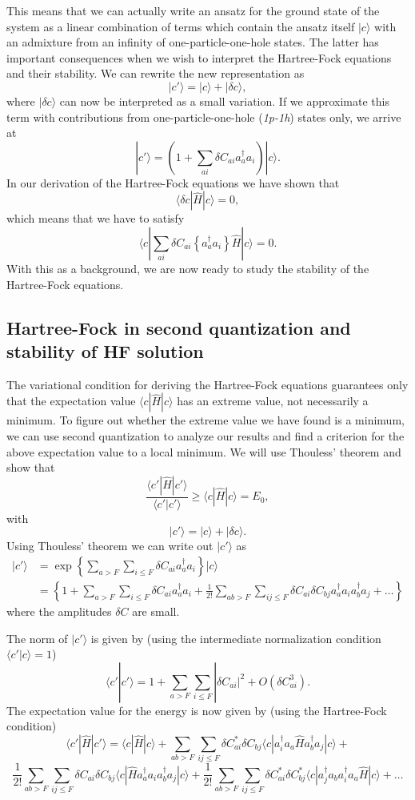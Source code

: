 \documentclass[%
oneside,                 %
final,                   %
10pt]{article}
\begin{document}
This means that we can actually write an ansatz for the ground state of the system as a linear combination of
terms which contain the ansatz itself $|c\rangle$ with  an admixture from an infinity of one-particle-one-hole states. The latter has important consequences when we wish to interpret the Hartree-Fock equations and their stability. We can rewrite the new representation as 
\[
|c'\rangle = |c\rangle+|\delta c\rangle,
\]
where $|\delta c\rangle$ can now be interpreted as a small variation. If we approximate this term with 
contributions from one-particle-one-hole (\emph{1p-1h}) states only, we arrive at 
\[
|c'\rangle = \left(1+\sum_{ai}\delta C_{ai}a_{a}^{\dagger}a_i\right)|c\rangle.
\]
In our derivation of the Hartree-Fock equations we have shown that 
\[
\langle \delta c| \hat{H} | c\rangle =0,
\]
which means that we have to satisfy
\[
\langle c|\sum_{ai}\delta C_{ai}\left\{a_{a}^{\dagger}a_i\right\} \hat{H} | c\rangle =0.
\]
With this as a background, we are now ready to study the stability of the Hartree-Fock equations.

\subsection*{Hartree-Fock in second quantization and stability of HF solution}

The variational condition for deriving the Hartree-Fock equations guarantees only that the expectation value $\langle c | \hat{H} | c \rangle$ has an extreme value, not necessarily a minimum. To figure out whether the extreme value we have found  is a minimum, we can use second quantization to analyze our results and find a criterion 
for the above expectation value to a local minimum. We will use Thouless' theorem and show that
\[
\frac{\langle c' |\hat{H} | c'\rangle}{\langle c' |c'\rangle} \ge \langle c |\hat{H} | c\rangle= E_0,
\]
with
\[
 {|c'\rangle} = {|c\rangle + |\delta c\rangle}.
\]
Using Thouless' theorem we can write out $|c'\rangle$ as
\begin{align}
 {|c'\rangle}&=\exp\left\{\sum_{a > F}\sum_{i \le F}\delta C_{ai}a_{a}^{\dagger}a_{i}\right\}| c\rangle\\ 
&=\left\{1+\sum_{a > F}\sum_{i \le F}\delta C_{ai}a_{a}^{\dagger}
a_{i}+\frac{1}{2!}\sum_{ab > F}\sum_{ij \le F}\delta C_{ai}\delta C_{bj}a_{a}^{\dagger}a_{i}a_{b}^{\dagger}a_{j}+\dots\right\}
\end{align}
where the amplitudes $\delta C$ are small.

The norm of $|c'\rangle$ is given by (using the intermediate normalization condition $\langle c' |c\rangle=1$) 
\[
\langle c' | c'\rangle = 1+\sum_{a>F}
\sum_{i\le F}|\delta C_{ai}|^2+O(\delta C_{ai}^3).
\]
The expectation value for the energy is now given by (using the Hartree-Fock condition)
\[
\langle c' |\hat{H} | c'\rangle=\langle c |\hat{H} | c\rangle +
\sum_{ab>F}
\sum_{ij\le F}\delta C_{ai}^*\delta C_{bj}\langle c |a_{i}^{\dagger}a_{a}\hat{H}a_{b}^{\dagger}a_{j}|c\rangle+
\]
\[
\frac{1}{2!}\sum_{ab>F}
\sum_{ij\le F}\delta C_{ai}\delta C_{bj}\langle c |\hat{H}a_{a}^{\dagger}a_{i}a_{b}^{\dagger}a_{j}|c\rangle+\frac{1}{2!}\sum_{ab>F}
\sum_{ij\le F}\delta C_{ai}^*\delta C_{bj}^*\langle c|a_{j}^{\dagger}a_{b}a_{i}^{\dagger}a_{a}\hat{H}|c\rangle
+\dots
\] 
\end{document}

